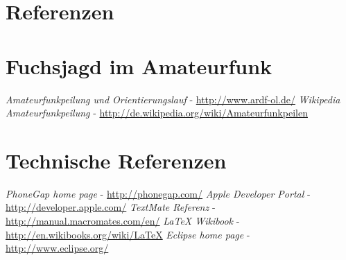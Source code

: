 
\newpage
\section{Referenzen} %
\label{sec:referenzen}

\begin{thebibliography}{breitestes Label}

\section*{Fuchsjagd im Amateurfunk}
    \textit{Amateurfunkpeilung und Orientierungslauf} - \url{http://www.ardf-ol.de/}
    \textit{Wikipedia Amateurfunkpeilung} - \url{http://de.wikipedia.org/wiki/Amateurfunkpeilen}
\section*{Technische Referenzen}
    \textit{PhoneGap home page} - \url{http://phonegap.com/}
    \textit{Apple Developer Portal} - \url{http://developer.apple.com/}
    \textit{TextMate Referenz} - \url{http://manual.macromates.com/en/}
    \textit{LaTeX Wikibook} - \url{http://en.wikibooks.org/wiki/LaTeX}
    \textit{Eclipse home page} - \url{http://www.eclipse.org/}

\end{thebibliography}

